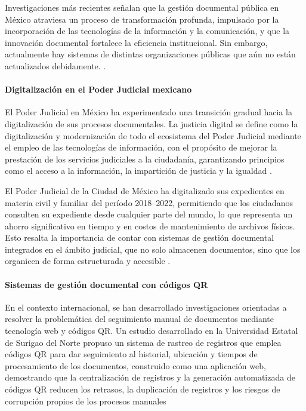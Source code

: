 Investigaciones más recientes señalan que la gestión documental pública en México atraviesa un proceso de transformación profunda, impulsado por la incorporación de las tecnologías de la información y la comunicación, y que la innovación documental fortalece la eficiencia institucional. Sin embargo, actualmente hay sistemas de distintas organizaciones públicas que aún no están actualizados debidamente. \cite{foneia2023innovacion}.

\paragraph{Digitalización en el Poder Judicial mexicano}
\label{par:digitalizacion_antecedentes_teoricos}
El Poder Judicial en México ha experimentado una transición gradual hacia la digitalización de sus procesos documentales. La justicia digital se define como la digitalización y modernización de todo el ecosistema del Poder Judicial mediante el empleo de las tecnologías de información, con el propósito de mejorar la prestación de los servicios judiciales a la ciudadanía, garantizando principios como el acceso a la información, la impartición de justicia y la igualdad \cite{docusign2022justicia}.

El Poder Judicial de la Ciudad de México ha digitalizado sus expedientes en materia civil y familiar del período 2018–2022, permitiendo que los ciudadanos consulten su expediente desde cualquier parte del mundo, lo que representa un ahorro significativo en tiempo y en costos de mantenimiento de archivos físicos. Esto resalta la importancia de contar con sistemas de gestión documental integrados en el ámbito judicial, que no solo almacenen documentos, sino que los organicen de forma estructurada y accesible \cite{docusign2022justicia}.

\paragraph{Sistemas de gestión documental con códigos QR}
\label{par:sistemas_antecedentes_teoricos}
En el contexto internacional, se han desarrollado investigaciones orientadas a resolver la problemática del seguimiento manual de documentos mediante tecnología web y códigos QR. Un estudio desarrollado en la Universidad Estatal de Surigao del Norte \cite{rtms2023} propuso un sistema de rastreo de registros que emplea códigos QR para dar seguimiento al historial, ubicación y tiempos de procesamiento de los documentos, construido como una aplicación web, demostrando que la centralización de registros y la generación automatizada de códigos QR reducen los retrasos, la duplicación de registros y los riesgos de corrupción propios de los procesos manuales

